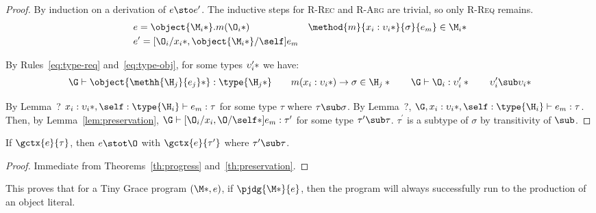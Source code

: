 \begin{theorem}[Preservation]
  \begin{proof}
    By induction on a derivation of $e \sto e^\prime$.  The inductive steps for
    \textsc{R-Rec} and \textsc{R-Arg} are trivial, so only \textsc{R-Req}
    remains.
%
    \begin{align*}
      &e = \object{\*\M_i*}.m(\*\O_i*) &
      \method{m}{\*x_i : \upsilon_i*}{\sigma}{e_m} \in \*\M_i* \\
      &e^\prime = [\*\O_i/x_i*, \object{\*\M_i*}/\self]e_m &
    \end{align*}

    \noindent By Rules~\ref{eq:type-req} and~\ref{eq:type-obj}, for some types
    $\*\upsilon^\prime_i*$ we have:
%
    \begin{displaymath}
      \G \vdash \object{\*\methh{\H_j}{e_j}*} : \type{\*\H_j*} \quad\quad
      m(\*x_i : \upsilon_i*) \to \sigma \in \*\H_j* \quad\quad
      \G \vdash \*\O_i : \upsilon^\prime_i* \quad\quad
      \*\upsilon^\prime_i \sub \upsilon_i*
    \end{displaymath}

    \noindent By Lemma~? $\*x_i : \upsilon_i*, \self : \type{\H_i} \vdash e_m :
    \tau$ for some type $\tau$ where $\tau \sub \sigma$.  By Lemma~?, $\G, \*x_i
    : \upsilon_i*, \self : \type{\H_i} \vdash e_m : \tau$.  Then, by
    Lemma~\ref{lem:preservation}, $\G \vdash [\*\O_i/x_i,\O/\self*]e_m :
    \tau^\prime$ for some type $\tau^\prime \sub \tau$.  $\tau^\prime$ is a
    subtype of $\sigma$ by transitivity of $\sub$.
  \end{proof}

\end{theorem}

\begin{theorem}
  \label{th:type-soundness}

  If $\gctx{e}{\tau}$, then $e \stot \O$ with $\gctx{e}{\tau^\prime}$ where
  $\tau^\prime \sub \tau$.

  \begin{proof}
    Immediate from Theorems~\ref{th:progress} and~\ref{th:preservation}.
  \end{proof}
\end{theorem}

\noindent This proves that for a Tiny Grace program $(\*\M*, e)$, if
$\pjdg{\*\M*}{e}$, then the program will always successfully run to the
production of an object literal.

